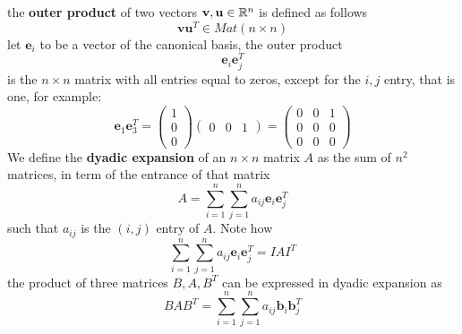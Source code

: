 \documentclass[10pt, letterpaper]{report}
\begin{document}
the \textbf{outer product} of two vectors $\mathbf v,\mathbf u\in{\mathbb R}^n$ is defined as follows\begin{equation}
    \mathbf v\mathbf u^T\in Mat(n\times n) 
\end{equation}
let $\mathbf e_i$ to be a vector of the canonical basis, the outer product \begin{equation}
    \mathbf e_i\mathbf e_j^T 
\end{equation}
is the $n\times n$ matrix with all entries equal to zeros, except for the $i,j$ entry, that is one, for example:\begin{equation}
   \mathbf e_1\mathbf e_3^T= \begin{pmatrix}
        1\\ 0\\ 0
    \end{pmatrix}\begin{pmatrix}
       0&0&1
    \end{pmatrix}=\begin{pmatrix}
        0&0&1\\ 
        0&0&0\\ 
        0&0&0
    \end{pmatrix}
\end{equation}
We define the \textbf{dyadic expansion} of an $n\times n$ matrix $A$ as the sum of $n^2$ matrices, in term of the entrance of that matrix\begin{equation}
    A=\sum_{i=1}^n\sum_{j=1}^n a_{ij}\mathbf e_i\mathbf e_j^T
\end{equation}
such that $a_{ij}$ is the $(i,j)$ entry of $A$. Note how \begin{equation}
    \sum_{i=1}^n\sum_{j=1}^n a_{ij}\mathbf e_i\mathbf e_j^T=IAI^T 
\end{equation}
the product of three matrices $B,A,B^T$ can be expressed in dyadic expansion as \begin{equation}
    BAB^T=\sum_{i=1}^n\sum_{j=1}^n a_{ij}\mathbf b_i\mathbf b_j^T
\end{equation}
\end{document}
